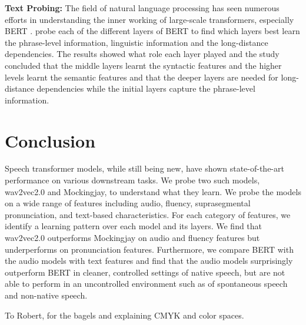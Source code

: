 \documentclass[sigconf]{acmart}
\newcommand{\wv}{wav2vec2.0\xspace}
\newcommand{\mj}{Mockingjay\xspace}
\begin{document}
\textbf{Text Probing:}
The field of natural language processing has seen numerous efforts in understanding the inner working of large-scale transformers, especially BERT \cite{jawahar-etal-2019-bert,cui2020does,ramnath2020towards}. \citet{jawahar-etal-2019-bert} probe each of the different layers of BERT to find which layers best learn the phrase-level information, linguistic information and the long-distance dependencies. The results showed what role each layer played and the study concluded that the middle layers learnt the syntactic features and the higher levels learnt the semantic features and that the deeper layers are needed for long-distance dependencies while the initial layers capture the phrase-level information. 


\section{Conclusion}
Speech transformer models, while still being new, have shown state-of-the-art performance on various downstream tasks. We probe two such models, wav2vec2.0 and Mockingjay, to understand what they learn. We probe the models on a wide range of features including audio, fluency, suprasegmental pronunciation, and text-based characteristics. For each category of features, we identify a learning pattern over each model and its layers. We find that {\wv} outperforms {\mj} on audio and fluency features but underperforms on pronunciation features. Furthermore, we compare BERT with the audio models with text features and find that the audio models surprisingly outperform BERT in cleaner, controlled settings of native speech, 
but are not able to perform in an uncontrolled environment such as of spontaneous speech and non-native speech. %
\begin{acks}
To Robert, for the bagels and explaining CMYK and color spaces.
\end{acks}
\end{document}
